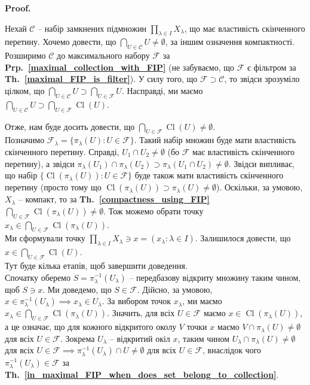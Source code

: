 \documentclass[a4paper, 10pt]{article}
\makeatletter
\theoremstyle{theoremdd}
\newcommand\thref[1]{\textbf{Th.~\ref{#1}}}
\newcommand\prpref[1]{\textbf{Prp.~\ref{#1}}}
\DeclareMathOperator{\Cl}{Cl}
\renewenvironment{proof}[1][Proof.\\]{\par
\pushQED{\hfill \qed}%
\normalfont \topsep6\p@\@plus6\p@\relax
\trivlist
\item\relax
{\bfseries
#1\@addpunct{.}}\hspace\labelsep\ignorespaces
}{%
\popQED\endtrivlist\@endpefalse
}
\makeatother
\begin{document}
\begin{proof}
Нехай $\mathcal{C}$ -- набір замкнених підмножин $\displaystyle\prod_{\lambda \in I} X_\lambda$, що має властивість скінченного перетину. Хочемо довести, що $\displaystyle\bigcap_{U \in \mathcal{C}} U \neq \emptyset$, за іншим означення компактності.\\
Розширимо $\mathcal{C}$ до максимального набору $\mathcal{F}$ за \prpref{maximal_collection_with_FIP} (не забуваємо, що $\mathcal{F}$ є фільтром за \thref{maximal_FIP_is_filter}). У силу того, що $\mathcal{F} \supset \mathcal{C}$, то звідси зрозуміло цілком, що $\displaystyle\bigcap_{U \in \mathcal{C}} U \supset \bigcap_{U \in \mathcal{F}} U$. Насправді, ми маємо $\displaystyle\bigcap_{U \in \mathcal{C}} U \supset \bigcap_{U \in \mathcal{F}} \Cl(U)$.

Отже, нам буде досить довести, що $\displaystyle\bigcap_{U \in \mathcal{F}} \Cl(U) \neq \emptyset$.\\
Позначимо $\mathcal{F}_\lambda = \{ \pi_\lambda(U) : U \in \mathcal{F} \}$. Такий набір множин буде мати властивість скінченного перетину. Справді, $U_1 \cap U_2 \neq \emptyset$ (бо $\mathcal{F}$ має властивість скінченного перетину), а звідси $\pi_\lambda(U_1) \cap \pi_\lambda(U_2) \supset \pi_\lambda(U_1 \cap U_2) \neq \emptyset$. Звідси випливає, що набір $\{\Cl(\pi_\lambda(U)) : U \in \mathcal{F}\}$ буде також мати властивість скінченного перетину (просто тому що $\Cl(\pi_\lambda(U)) \supset \pi_\lambda(U) \neq \emptyset$). Оскільки, за умовою, $X_\lambda$ -- компакт, то за \thref{compactness_using_FIP} $\displaystyle\bigcap_{U \in \mathcal{F}} \Cl(\pi_\lambda(U)) \neq \emptyset$. Тож можемо обрати точку $x_\lambda \in \displaystyle\bigcap_{U \in \mathcal{F}} \Cl(\pi_\lambda(U))$.\\
Ми сформували точку $\displaystyle\prod_{\lambda \in I} X_\lambda \ni x = (x_\lambda : \lambda \in I)$. Залишилося довести, що $x \in \displaystyle\bigcap_{U \in \mathcal{F}} \Cl (U)$.\\
Тут буде кілька етапів, щоб завершити доведення.\\
Спочатку оберемо $S = \pi_\lambda^{-1}(U_\lambda)$ -- передбазову відкриту множину таким чином, щоб $S \ni x$. Ми доведемо, що $S \in \mathcal{F}$. Дійсно, за умовою, $x \in \pi_\lambda^{-1}(U_\lambda) \implies x_\lambda \in U_\lambda$. За вибором точок $x_\lambda$, ми маємо $x_\lambda \in \displaystyle\bigcap_{U \in \mathcal{F}} \Cl(\pi_\lambda(U))$. Значить, для всіх $U \in \mathcal{F}$ маємо $x \in \Cl(\pi_\lambda(U))$, а це означає, що для кожного відкритого околу $V$ точки $x$ маємо $V \cap \pi_\lambda(U) \neq \emptyset$ для всіх $U \in \mathcal{F}$. Зокрема $U_\lambda$ -- відкритий окіл $x$, таким чином $U_\lambda \cap \pi_\lambda(U) \neq \emptyset$ для всіх $U \in \mathcal{F} \implies \pi_\lambda^{-1}(U_\lambda) \cap U \neq \emptyset$ для всіх $U \in \mathcal{F}$, внаслідок чого $\pi_\lambda^{-1}(U_\lambda) \in \mathcal{F}$ за \thref{in_maximal_FIP_when_does_set_belong_to_collection}.\\

\end{proof}
\end{document}
